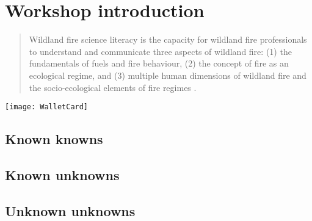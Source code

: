 \chapter{Workshop introduction} 

\begin{quote}
	Wildland fire science literacy is the capacity for wildland fire professionals to understand and communicate three aspects of wildland fire: (1) the fundamentals of fuels and fire behaviour, (2) the concept of fire as an ecological regime, and (3) multiple human dimensions of wildland fire and the socio-ecological elements of fire regimes \citep[][ Fig.~\ref{fig:WalletCard}]{mcgranahan2018}.
\end{quote}  

\begin{figure*}[!b] 

	\begin{center}
		\texttt{[image: WalletCard]}
	\end{center}
	\caption{Two arenas of wildland fire science\textemdash the field and the office. 
	This figure helps fire professionals from each arena identify characteristics of the fire environment or fire regime that dominate their colleagues' perspective.  
	\label{fig:WalletCard} }  %
\end{figure*}


\section{Known knowns} 

\section{Known unknowns}

\section{Unknown unknowns} 

